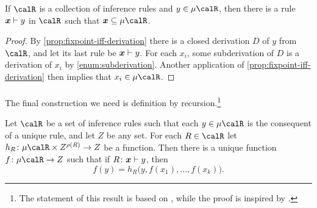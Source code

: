 \documentclass[a4paper, 11pt, article, danish, oneside]{memoir}
\newcommand{\newpar}{\paragraph{}}
\renewcommand{\prod}{\times}
\begin{document}
\begin{corollary}[Inversion]
    \label{cor:inversion}
    If $\calR$ is a collection of inference rules and $y \in \mu \calR$, then there is a rule $\myinfrule{}{\seq{x}}{y}$ in $\calR$ such that $\seq{x} \subseteq \mu \calR$.
\end{corollary}

\begin{proof}
    By \cref{prop:fixpoint-iff-derivation} there is a closed derivation $D$ of $y$ from $\calR$, and let its last rule be $\myinfrule{}{\seq{x}}{y}$. For each $x_i$, some subderivation of $D$ is a derivation of $x_i$ by \cref{enum:subderivation}. Another application of \cref{prop:fixpoint-iff-derivation} then implies that $x_i \in \mu \calR$.
\end{proof}


\newpar

The final construction we need is definition by recursion.\footnote{The statement of this result is based on \textcite[Theorem~3.2]{goldrei-set-theory}, while the proof is inspired by \textcite[§8.18]{davey-priestley-order}.}

\begin{theorem}
    \label{thm:recursive-definitions}
    Let $\calR$ be a set of inference rules such that each $y \in \mu\calR$ is the consequent of a unique rule, and let $Z$ be any set. For each $R \in \calR$ let $h_R \colon \mu \calR \prod Z^{\rho(R)} \to Z$ be a function. Then there is a unique function $f \colon \mu \calR \to Z$ such that if $\myinfrule{R}{\seq{x}}{y}$, then
    \begin{equation*}
        f(y)
            = h_R \bigl( y, f(x_1), \ldots, f(x_k) \bigr).
    \end{equation*}
\end{theorem}
\end{document}
